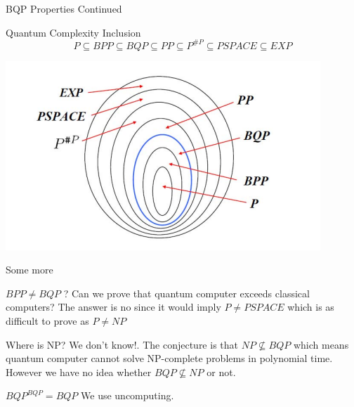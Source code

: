     \begin{frame}{BQP Properties Continued}
        \begin{block}{Quantum Complexity Inclusion}
            $$P \subseteq BPP \subseteq BQP \subseteq PP \subseteq P^{\# P} \subseteq PSPACE \subseteq EXP$$
        \end{block}
        \begin{center}
            \includegraphics[scale = 0.5]{images/Complexdiag.png}
        \end{center}
    \end{frame}
    \begin{frame}{Some more}
        \begin{block}{$BPP \neq BQP$ ?}
            Can we prove that quantum computer exceeds classical computers? The answer is no since it would imply
            $P \neq PSPACE$ which is as difficult to prove as $P \neq NP$
        \end{block}
        \pause
        \begin{block}{Where is NP?}
            We don't know!. The conjecture is that $NP \nsubseteq BQP$ which means quantum computer cannot solve NP-complete
            problems in polynomial time. However we have no idea whether $BQP \nsubseteq NP$ or not.
        \end{block}
        \pause
        \begin{block}{$BQP^{BQP} = BQP$}
            We use uncomputing.
        \end{block}
    \end{frame}
